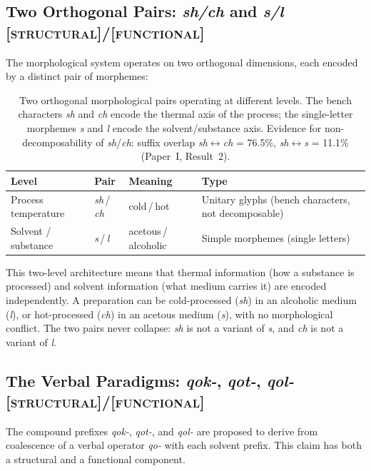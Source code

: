 \documentclass[11pt,a4paper]{article}
\newcommand{\structural}{\textsc{[structural]}}
\newcommand{\functional}{\textsc{[functional]}}
\begin{document}
\subsection{Two Orthogonal Pairs: \textit{sh/ch} and \textit{s/l} \structural{}/\functional{}}

The morphological system operates on two orthogonal dimensions, each encoded by a distinct pair of morphemes:

\begin{table}[H]
\centering
\begin{tabular}{llll}
\toprule
Level & Pair & Meaning & Type \\
\midrule
Process temperature & \textit{sh}\,/\,\textit{ch} & cold\,/\,hot & Unitary glyphs (bench characters, not decomposable) \\
Solvent / substance & \textit{s}\,/\,\textit{l} & acetous\,/\,alcoholic & Simple morphemes (single letters) \\
\bottomrule
\end{tabular}
\caption{Two orthogonal morphological pairs operating at different levels. The bench characters \textit{sh} and \textit{ch} encode the thermal axis of the process; the single-letter morphemes \textit{s} and \textit{l} encode the solvent/substance axis. Evidence for non-decomposability of \textit{sh}/\textit{ch}: suffix overlap \textit{sh}$\leftrightarrow$\textit{ch} = 76.5\%, \textit{sh}$\leftrightarrow$\textit{s} = 11.1\% (Paper~I, Result~2).}
\end{table}

This two-level architecture means that thermal information (how a substance is processed) and solvent information (what medium carries it) are encoded independently. A preparation can be cold-processed (\textit{sh}) in an alcoholic medium (\textit{l}), or hot-processed (\textit{ch}) in an acetous medium (\textit{s}), with no morphological conflict. The two pairs never collapse: \textit{sh} is not a variant of \textit{s}, and \textit{ch} is not a variant of \textit{l}.

\subsection{The Verbal Paradigms: \textit{qok-}, \textit{qot-}, \textit{qol-} \structural{}/\functional{}}

The compound prefixes \textit{qok-}, \textit{qot-}, and \textit{qol-} are proposed to derive from coalescence of a verbal operator \textit{qo-} with each solvent prefix. This claim has both a structural and a functional component.
\end{document}
